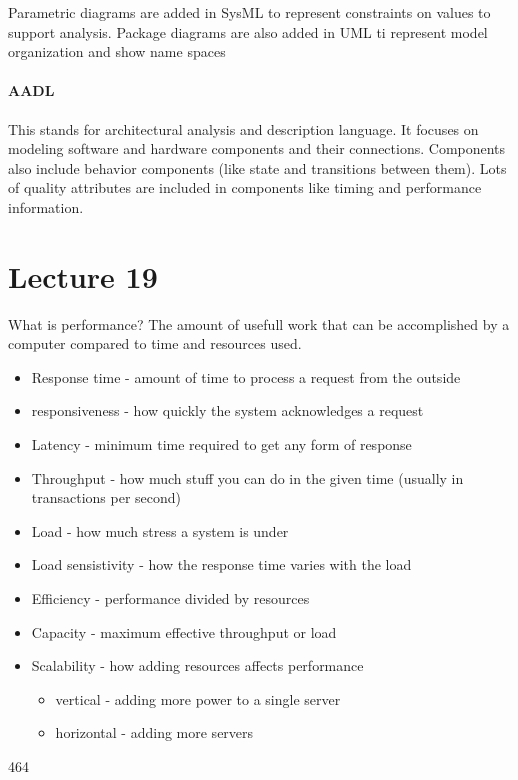 \documentclass{article}
\begin{document}
Parametric diagrams are added in SysML to represent constraints on values to support analysis. Package diagrams are also added in UML ti represent model organization and show name spaces

\paragraph{AADL} %
\label{par:aadl}
This stands for architectural analysis and description language. It focuses on modeling software and hardware components and their connections. Components also include behavior components (like state and transitions between them). Lots of quality attributes are included in components like timing and performance information.


\section*{Lecture 19} %
\label{sec:lecture_19}
What is performance? The amount of usefull work that can be accomplished by a computer compared to time and resources used.

\begin{itemize}
    \item Response time - amount of time to process a request from the outside
    \item responsiveness - how quickly the system acknowledges a request
    \item Latency - minimum time required to get any form of response
    \item Throughput - how much stuff you can do in the given time (usually in transactions per second)
    \item Load - how much stress a system is under
    \item Load sensistivity - how the response time varies with the load
    \item Efficiency - performance divided by resources
    \item Capacity - maximum effective throughput or load
    \item Scalability - how adding resources affects performance
    \begin{itemize}
        \item vertical - adding more power to a single server
        \item horizontal - adding more servers
    \end{itemize}
\end{itemize}464
\end{document}
